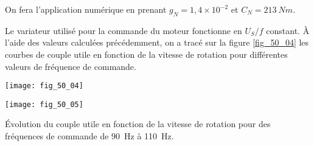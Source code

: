 \begin{rem}
On fera l’application numérique en prenant $g_N = 1,4 \times 10^{-2}$ et $C_N =\SI{213}{Nm}$.
\end{rem}

Le variateur utilisé pour la commande du moteur fonctionne en $U_S/f$ constant. À l’aide
des valeurs calculées précédemment, on a tracé sur la figure \autoref{fig_50_04}  les courbes de couple utile
en fonction de la vitesse de rotation pour différentes valeurs de fréquence de commande.

\begin{marginfigure}
\centering
\texttt{[image: fig\_50\_04]}

\texttt{[image: fig\_50\_05]}
\caption{Évolution du couple utile en fonction de la vitesse de rotation pour des
fréquences de commande de \SI{90}{Hz} à \SI{110}{Hz}. \label{fig_50_04}}
\end{marginfigure}
\fi

\ifprof
\else
\fi

\ifprof
\else


\fi